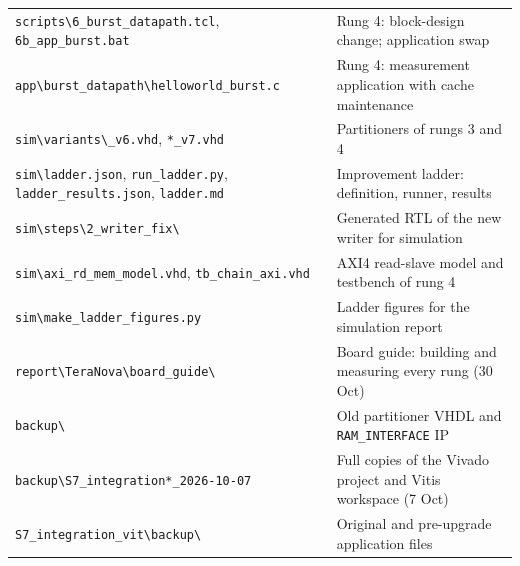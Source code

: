 \documentclass[11pt,a4paper]{article}
\newcommand{\code}[1]{\texttt{#1}}
\begin{document}
\begin{longtable}{@{}p{}p{}@{}}
\code{scripts\textbackslash 6\_burst\_datapath.tcl}, \code{6b\_app\_burst.bat} & Rung 4: block-design change; application swap \\
\code{app\textbackslash burst\_datapath\textbackslash helloworld\_burst.c} & Rung 4: measurement application with cache maintenance \\
\code{sim\textbackslash variants\textbackslash *\_v6.vhd}, \code{*\_v7.vhd} & Partitioners of rungs 3 and 4 \\
\code{sim\textbackslash ladder.json}, \code{run\_ladder.py}, \code{ladder\_}\allowbreak\code{results.json}, \code{ladder.md} & Improvement ladder: definition, runner, results \\
\code{sim\textbackslash steps\textbackslash 2\_writer\_fix\textbackslash *} & Generated RTL of the new writer for simulation \\
\code{sim\textbackslash axi\_rd\_mem\_model.vhd}, \code{tb\_chain\_axi.vhd} & AXI4 read-slave model and testbench of rung 4 \\
\code{sim\textbackslash make\_ladder\_figures.py} & Ladder figures for the simulation report \\
\code{report\textbackslash TeraNova\textbackslash board\_guide\textbackslash *} & Board guide: building and measuring every rung (30 Oct) \\
\midrule
\code{backup\textbackslash *} & Old partitioner VHDL and \code{RAM\_INTERFACE} IP \\
\code{backup\textbackslash S7\_integration*\_2026-10-07} & Full copies of the Vivado project and Vitis workspace (7 Oct) \\
\code{S7\_integration\_vit\textbackslash backup\textbackslash *} & Original and pre-upgrade application files \\
\bottomrule
\end{longtable}

\end{document}
